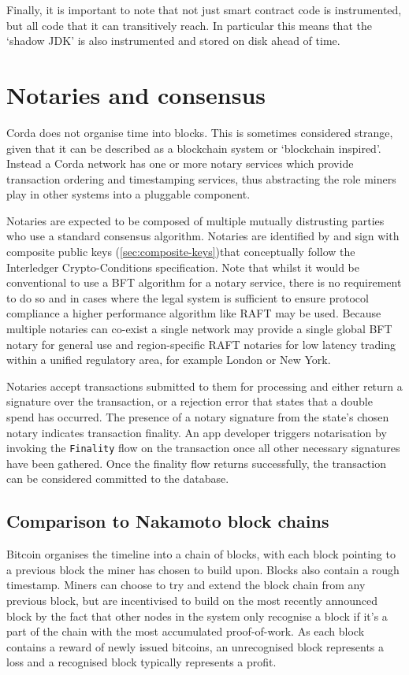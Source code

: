 \documentclass{article}
\begin{document}
Finally, it is important to note that not just smart contract code is instrumented, but all code that it can transitively
reach. In particular this means that the `shadow JDK' is also instrumented and stored on disk ahead of time.

\section{Notaries and consensus}\label{sec:notaries}

Corda does not organise time into blocks. This is sometimes considered strange, given that it can be described as a
blockchain system or `blockchain inspired'. Instead a Corda network has one or more notary services which provide
transaction ordering and timestamping services, thus abstracting the role miners play in other systems into a pluggable
component.

Notaries are expected to be composed of multiple mutually distrusting parties who use a standard consensus algorithm.
Notaries are identified by and sign with composite public keys (\cref{sec:composite-keys})that conceptually follow the
Interledger Crypto-Conditions specification\cite{ILPCC}. Note that whilst it would be conventional to use a BFT
algorithm for a notary service, there is no requirement to do so and in cases where the legal system is sufficient to
ensure protocol compliance a higher performance algorithm like RAFT may be used. Because multiple notaries can co-exist
a single network may provide a single global BFT notary for general use and region-specific RAFT notaries for low
latency trading within a unified regulatory area, for example London or New York.

Notaries accept transactions submitted to them for processing and either return a signature over the transaction, or
a rejection error that states that a double spend has occurred. The presence of a notary signature from the state's
chosen notary indicates transaction finality. An app developer triggers notarisation by invoking the
\texttt{Finality} flow on the transaction once all other necessary signatures have been gathered. Once the finality flow
returns successfully, the transaction can be considered committed to the database.

\subsection{Comparison to Nakamoto block chains}

Bitcoin organises the timeline into a chain of blocks, with each block pointing to a previous block the miner has chosen
to build upon. Blocks also contain a rough timestamp. Miners can choose to try and extend the block chain from any
previous block, but are incentivised to build on the most recently announced block by the fact that other nodes in the
system only recognise a block if it's a part of the chain with the most accumulated proof-of-work. As each block contains
a reward of newly issued bitcoins, an unrecognised block represents a loss and a recognised block typically represents
a profit.
\end{document}
